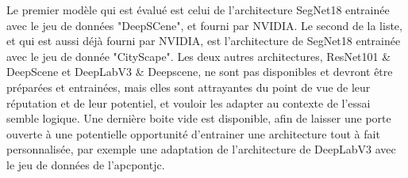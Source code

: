 ﻿\noindent Le premier modèle qui est évalué est celui de l'architecture SegNet18 entrainée avec le jeu de données "DeepSCene", et fourni par NVIDIA. Le second de la liste, et qui est aussi déjà fourni par NVIDIA, est l'architecture de SegNet18 entrainée avec le jeu de donnée "CityScape". Les deux autres architectures, ResNet101 \& DeepScene et DeepLabV3 \& Deepscene, ne sont pas disponibles et devront être préparées et entrainées, mais elles sont attrayantes du point de vue de leur réputation et de leur potentiel, et vouloir les adapter au contexte de l'essai semble logique. Une dernière boite vide est disponible, afin de laisser une porte ouverte à une potentielle opportunité d'entrainer une architecture tout à fait personnalisée, par exemple une adaptation de l'architecture de DeepLabV3 avec le jeu de données de l'\acrshort{apcpontjc}.